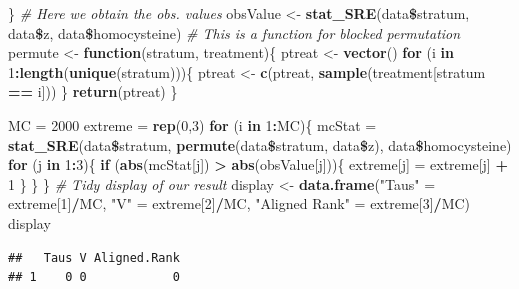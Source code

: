 \documentclass[]{article}
\newenvironment{Shaded}{\begin{snugshade}}{\end{snugshade}}
\newcommand{\KeywordTok}[1]{\textcolor[rgb]{0.13,0.29,0.53}{\textbf{#1}}}
\newcommand{\DecValTok}[1]{\textcolor[rgb]{0.00,0.00,0.81}{#1}}
\newcommand{\StringTok}[1]{\textcolor[rgb]{0.31,0.60,0.02}{#1}}
\newcommand{\CommentTok}[1]{\textcolor[rgb]{0.56,0.35,0.01}{\textit{#1}}}
\newcommand{\ControlFlowTok}[1]{\textcolor[rgb]{0.13,0.29,0.53}{\textbf{#1}}}
\newcommand{\OperatorTok}[1]{\textcolor[rgb]{0.81,0.36,0.00}{\textbf{#1}}}
\newcommand{\NormalTok}[1]{#1}
\begin{document}
\begin{Shaded}
\begin{Highlighting}[]
\NormalTok{\}}
\CommentTok{# Here we obtain the obs. values}
\NormalTok{obsValue <-}\StringTok{ }\KeywordTok{stat_SRE}\NormalTok{(data}\OperatorTok{\$}\NormalTok{stratum, data}\OperatorTok{\$}\NormalTok{z, data}\OperatorTok{\$}\NormalTok{homocysteine)}
\CommentTok{# This is a function for blocked permutation}
\NormalTok{permute <-}\StringTok{ }\ControlFlowTok{function}\NormalTok{(stratum, treatment)\{}
\NormalTok{  ptreat <-}\StringTok{ }\KeywordTok{vector}\NormalTok{()}
  \ControlFlowTok{for}\NormalTok{ (i }\ControlFlowTok{in} \DecValTok{1}\OperatorTok{:}\KeywordTok{length}\NormalTok{(}\KeywordTok{unique}\NormalTok{(stratum)))\{}
\NormalTok{    ptreat <-}\StringTok{ }\KeywordTok{c}\NormalTok{(ptreat, }\KeywordTok{sample}\NormalTok{(treatment[stratum }\OperatorTok{==}\StringTok{ }\NormalTok{i]))}
\NormalTok{  \}}
  \KeywordTok{return}\NormalTok{(ptreat)}
\NormalTok{\}}

\NormalTok{MC =}\StringTok{ }\DecValTok{2000}
\NormalTok{extreme =}\StringTok{ }\KeywordTok{rep}\NormalTok{(}\DecValTok{0}\NormalTok{,}\DecValTok{3}\NormalTok{)}
\ControlFlowTok{for}\NormalTok{ (i }\ControlFlowTok{in} \DecValTok{1}\OperatorTok{:}\NormalTok{MC)\{}
\NormalTok{  mcStat =}\StringTok{ }\KeywordTok{stat_SRE}\NormalTok{(data}\OperatorTok{\$}\NormalTok{stratum, }\KeywordTok{permute}\NormalTok{(data}\OperatorTok{\$}\NormalTok{stratum, data}\OperatorTok{\$}\NormalTok{z), data}\OperatorTok{\$}\NormalTok{homocysteine)}
  \ControlFlowTok{for}\NormalTok{ (j }\ControlFlowTok{in} \DecValTok{1}\OperatorTok{:}\DecValTok{3}\NormalTok{)\{}
    \ControlFlowTok{if}\NormalTok{ (}\KeywordTok{abs}\NormalTok{(mcStat[j]) }\OperatorTok{>}\StringTok{ }\KeywordTok{abs}\NormalTok{(obsValue[j]))\{}
\NormalTok{      extreme[j] =}\StringTok{ }\NormalTok{extreme[j] }\OperatorTok{+}\StringTok{ }\DecValTok{1}
\NormalTok{    \}}
\NormalTok{  \}}
\NormalTok{\}}
\CommentTok{# Tidy display of our result}
\NormalTok{display <-}\StringTok{ }\KeywordTok{data.frame}\NormalTok{(}\StringTok{"Taus"}\NormalTok{ =}\StringTok{ }\NormalTok{extreme[}\DecValTok{1}\NormalTok{]}\OperatorTok{/}\NormalTok{MC, }\StringTok{"V"}\NormalTok{ =}\StringTok{ }\NormalTok{extreme[}\DecValTok{2}\NormalTok{]}\OperatorTok{/}\NormalTok{MC, }\StringTok{"Aligned Rank"}\NormalTok{ =}\StringTok{ }\NormalTok{extreme[}\DecValTok{3}\NormalTok{]}\OperatorTok{/}\NormalTok{MC)}
\NormalTok{display}
\end{Highlighting}
\end{Shaded}

\begin{verbatim}
##   Taus V Aligned.Rank
## 1    0 0            0
\end{verbatim}
\end{document}
